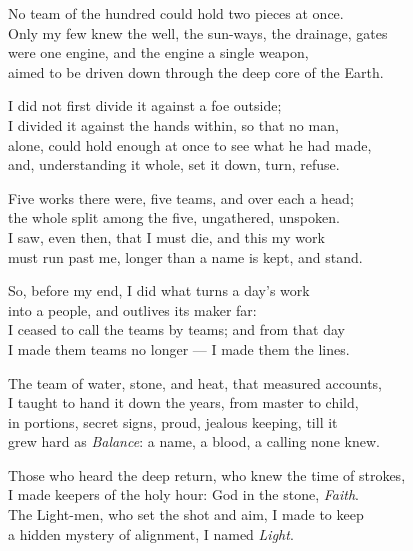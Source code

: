 \begin{founder}
No team of the hundred could hold two pieces at once.\\
Only my few knew the well, the sun-ways, the drainage, gates\\
were one engine, and the engine a single weapon,\\
aimed to be driven down through the deep core of the Earth.\\
\medskip

I did not first divide it against a foe outside;\\
I divided it against the hands within, so that no man,\\
alone, could hold enough at once to see what he had made,\\
and, understanding it whole, set it down, turn, refuse.\\

\ornament

Five works there were, five teams, and over each a head;\\
the whole split among the five, ungathered, unspoken.\\
I saw, even then, that I must die, and this my work\\
must run past me, longer than a name is kept, and stand.\\
\medskip

So, before my end, I did what turns a day's work\\
into a people, and outlives its maker far:\\
I ceased to call the teams by teams; and from that day\\
I made them teams no longer — I made them the lines.\\
\medskip

The team of water, stone, and heat, that measured accounts,\\
I taught to hand it down the years, from master to child,\\
in portions, secret signs, proud, jealous keeping, till it\\
grew hard as \emph{Balance}: a name, a blood, a calling none knew.\\
\medskip

Those who heard the deep return, who knew the time of strokes,\\
I made keepers of the holy hour: God in the stone, \emph{Faith}.\\
The Light-men, who set the shot and aim, I made to keep\\
a hidden mystery of alignment, I named \emph{Light}.\\
\medskip


\end{founder}
